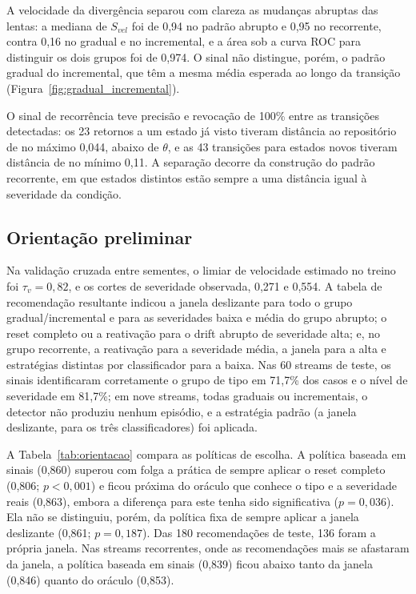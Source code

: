 

A velocidade da divergência separou com clareza as mudanças abruptas das
lentas: a mediana de $S_{vel}$ foi de 0,94 no padrão abrupto e 0,95 no
recorrente, contra 0,16 no gradual e no incremental, e a área sob a curva ROC
para distinguir os dois grupos foi de 0,974. O sinal não distingue, porém, o
padrão gradual do incremental, que têm a mesma média esperada ao longo da
transição (Figura~\ref{fig:gradual_incremental}).

O sinal de recorrência teve precisão e revocação de 100\% entre as transições
detectadas: os 23 retornos a um estado já visto tiveram distância ao
repositório de no máximo 0,044, abaixo de $\theta$, e as 43 transições para
estados novos tiveram distância de no mínimo 0,11. A separação decorre da
construção do padrão recorrente, em que estados distintos estão sempre a uma
distância igual à severidade da condição.

\subsection{Orientação preliminar}

Na validação cruzada entre sementes, o limiar de velocidade estimado no
treino foi $\tau_v = 0{,}82$, e os cortes de severidade observada, 0,271 e
0,554. A tabela de recomendação resultante indicou a janela deslizante para todo
o grupo gradual/incremental e para as severidades baixa e média do grupo
abrupto; o reset completo ou a reativação para o drift abrupto de severidade
alta; e, no grupo recorrente, a reativação para a severidade média, a janela
para a alta e estratégias distintas por classificador para a baixa. Nas 60 streams de teste, os sinais identificaram corretamente o
grupo de tipo em 71,7\% dos casos e o nível de severidade em 81,7\%; em nove
streams, todas graduais ou incrementais, o detector não produziu nenhum
episódio, e a estratégia padrão (a janela deslizante, para os três
classificadores) foi aplicada.

A Tabela~\ref{tab:orientacao} compara as políticas de escolha. A política
baseada em sinais (0,860) superou com folga a prática de sempre aplicar o
reset completo (0,806; $p < 0{,}001$) e ficou próxima do oráculo que conhece o
tipo e a severidade reais (0,863), embora a diferença para este tenha sido
significativa ($p = 0{,}036$). Ela não se distinguiu, porém, da política
fixa de sempre aplicar a janela deslizante (0,861; $p = 0{,}187$). Das 180
recomendações de teste, 136 foram a própria janela. Nas streams recorrentes,
onde as recomendações mais se afastaram da janela, a política baseada em
sinais (0,839) ficou abaixo tanto da janela (0,846) quanto do oráculo
(0,853).


